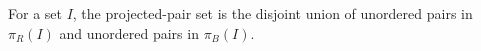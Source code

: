 \begin{definition}
For a set \(I\), the projected-pair set is the disjoint union of unordered
pairs in \(\pi_R(I)\) and unordered pairs in \(\pi_B(I)\).
\end{definition}
